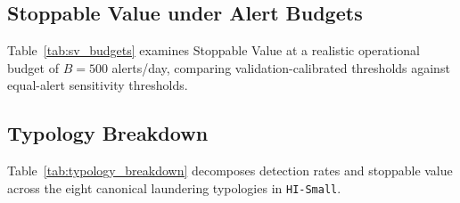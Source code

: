 \documentclass[pdflatex,sn-mathphys,Numbered]{sn-jnl}
\renewenvironment{table*}[1][!htbp]{\begin{tableorg}[#1]\begin{center}\tablebodyfont}{\end{center}\end{tableorg}}
\theoremstyle{thmstyleone}
\theoremstyle{thmstyletwo}
\theoremstyle{thmstylethree}
\begin{document}
\subsection{Stoppable Value under Alert Budgets}
Table~\ref{tab:sv_budgets} examines Stoppable Value at a realistic operational budget of $B=500$ alerts/day, comparing validation-calibrated thresholds against equal-alert sensitivity thresholds.

\begin{table}[!htbp]
\centering
\small
\caption{\textbf{Stoppable Value Analysis at Alert Budget $B=500$ alerts/day (\texttt{HI-Small}).}}
\label{tab:sv_budgets}
\end{table}

\subsection{Typology Breakdown}
Table~\ref{tab:typology_breakdown} decomposes detection rates and stoppable value across the eight canonical laundering typologies in \texttt{HI-Small}.
\end{document}
